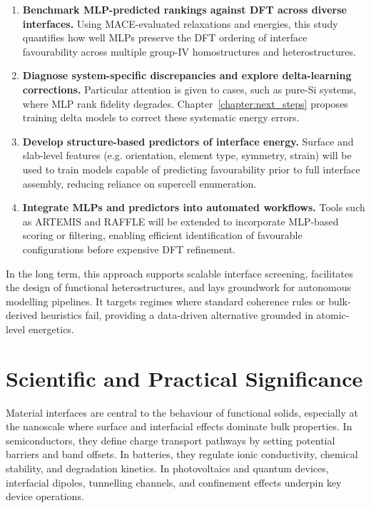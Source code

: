 \begin{enumerate}
    \item \textbf{Benchmark MLP-predicted rankings against DFT across diverse interfaces.} Using MACE-evaluated
    relaxations and energies, this study quantifies how well MLPs preserve the DFT ordering of interface favourability
    across multiple group-IV homostructures and heterostructures.

    \item \textbf{Diagnose system-specific discrepancies and explore delta-learning corrections.} Particular attention
    is given to cases, such as pure-Si systems, where MLP rank fidelity degrades. Chapter~\ref{chapter:next_steps}
    proposes training delta models to correct these systematic energy errors.

    \item \textbf{Develop structure-based predictors of interface energy.} Surface and slab-level features (e.g.
    orientation, element type, symmetry, strain) will be used to train models capable of predicting favourability
    prior to full interface assembly, reducing reliance on supercell enumeration.

    \item \textbf{Integrate MLPs and predictors into automated workflows.} Tools such as ARTEMIS and RAFFLE will be
    extended to incorporate MLP-based scoring or filtering, enabling efficient identification of favourable
    configurations before expensive DFT refinement.
\end{enumerate}

In the long term, this approach supports scalable interface screening, facilitates the design of functional
heterostructures, and lays groundwork for autonomous modelling pipelines. It targets regimes where standard coherence
rules or bulk-derived heuristics fail, providing a data-driven alternative grounded in atomic-level energetics.

\section{Scientific and Practical Significance}
\label{section:scientific_and_practical_significance}

Material interfaces are central to the behaviour of functional solids, especially at the nanoscale where surface and
interfacial effects dominate bulk properties. In semiconductors, they define charge transport pathways by setting
potential barriers and band offsets. In batteries, they regulate ionic conductivity, chemical stability, and
degradation kinetics. In photovoltaics and quantum devices, interfacial dipoles, tunnelling channels, and confinement
effects underpin key device operations.

